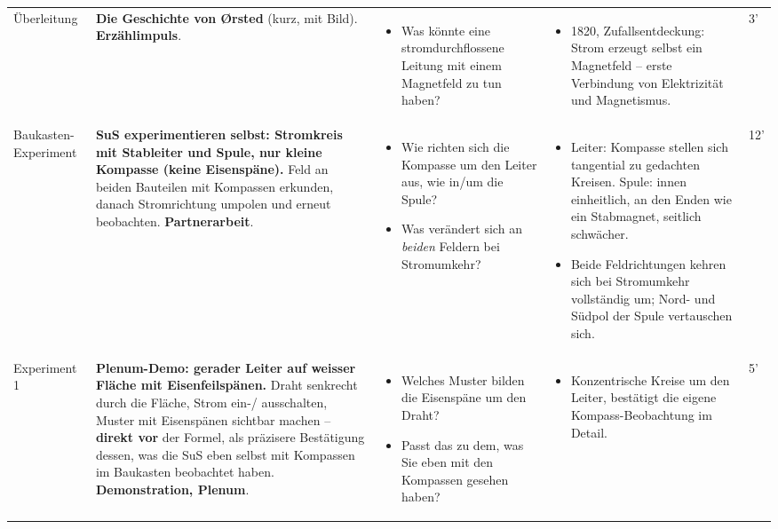 \documentclass[11pt,a4paper]{article}
\newcommand{\Methode}[1]{{\small\color{groupteal}\textbf{#1}}}
\begin{document}
\begin{xltabular}{\textwidth}{@{}Y{2.1cm} Y{6.6cm} Y{6.6cm} Y{6.6cm} p{1.1cm}@{}}
Überleitung &
\textbf{Die Geschichte von Ørsted} (kurz, mit Bild). \Methode{Erzählimpuls}. &
\begin{itemize}
  \item Was könnte eine stromdurchflossene Leitung mit einem Magnetfeld
  zu tun haben?
\end{itemize} &
\begin{itemize}
  \item 1820, Zufallsentdeckung: Strom erzeugt selbst ein Magnetfeld --
  erste Verbindung von Elektrizität und Magnetismus.
\end{itemize} &
3' \\[0.6em]

Baukasten-Experiment &
\textbf{SuS experimentieren selbst: Stromkreis mit Stableiter und Spule,
nur kleine Kompasse (keine Eisenspäne).} Feld an beiden Bauteilen mit
Kompassen erkunden, danach Stromrichtung umpolen und erneut beobachten.
\Methode{Partnerarbeit}. &
\begin{itemize}
  \item Wie richten sich die Kompasse um den Leiter aus, wie in/um die
  Spule?
  \item Was verändert sich an \emph{beiden} Feldern bei Stromumkehr?
\end{itemize} &
\begin{itemize}
  \item Leiter: Kompasse stellen sich tangential zu gedachten Kreisen.
  Spule: innen einheitlich, an den Enden wie ein Stabmagnet, seitlich
  schwächer.
  \item Beide Feldrichtungen kehren sich bei Stromumkehr vollständig um;
  Nord- und Südpol der Spule vertauschen sich.
\end{itemize} &
12' \\[0.6em]

Experiment 1 &
\textbf{Plenum-Demo: gerader Leiter auf weisser Fläche mit
Eisenfeilspänen.} Draht senkrecht durch die Fläche, Strom ein-/
ausschalten, Muster mit Eisenspänen sichtbar machen -- \textbf{direkt vor}
der Formel, als präzisere Bestätigung dessen, was die SuS eben selbst mit
Kompassen im Baukasten beobachtet haben. \Methode{Demonstration, Plenum}. &
\begin{itemize}
  \item Welches Muster bilden die Eisenspäne um den Draht?
  \item Passt das zu dem, was Sie eben mit den Kompassen gesehen haben?
\end{itemize} &
\begin{itemize}
  \item Konzentrische Kreise um den Leiter, bestätigt die eigene
  Kompass-Beobachtung im Detail.
\end{itemize} &
5' \\[0.6em]


\end{xltabular}
\end{document}
